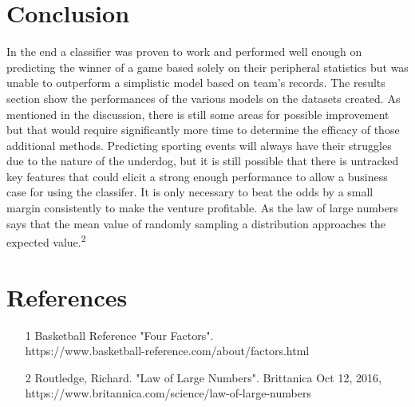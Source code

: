 \documentclass[12pt]{article}%
\begin{document}
\section{Conclusion}
In the end a classifier was proven to work and performed well enough on predicting the winner of a game based solely on their peripheral statistics but was unable to outperform a simplistic model based on team's records. The results section show the performances of the various models on the datasets created. As mentioned in the discussion, there is still some areas for possible improvement but that would require significantly more time to determine the efficacy of those additional methods. Predicting sporting events will always have their struggles due to the nature of the underdog, but it is still possible that there is untracked key features that could elicit a strong enough performance to allow a business case for using the classifer. It is only necessary to beat the odds by a small margin consistently to make the venture profitable. As the law of large numbers says that the mean value of randomly sampling a distribution approaches the expected value.\textsuperscript{2}

\section{References}
\begin{enumerate}
\item [1] Basketball Reference "Four Factors". \\
  https://www.basketball-reference.com/about/factors.html
\item [2] Routledge, Richard. "Law of Large Numbers". Brittanica Oct 12, 2016, https://www.britannica.com/science/law-of-large-numbers
\end{enumerate}
\end{document}
